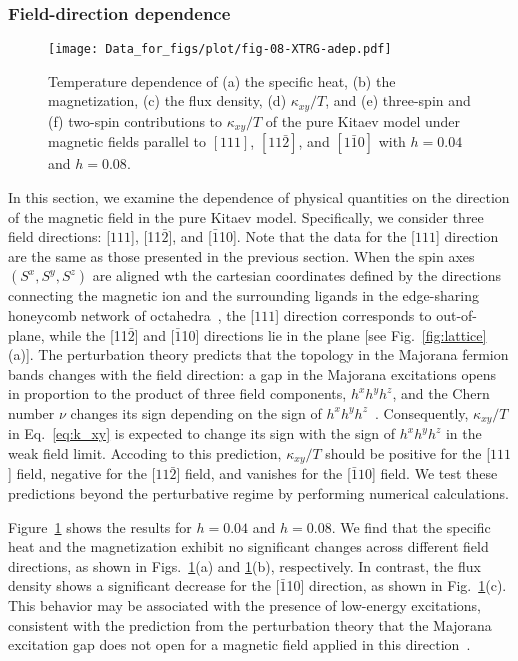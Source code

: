 \documentclass[twocolumn,superscriptaddress,showpacs, longbibliography, aps, prx]{revtex4-2}
\begin{document}
\subsubsection{Field-direction dependence}
\label{subsec:field_direction_dep}

\begin{figure}[htb]
  \begin{center}
    \texttt{[image: Data\_for\_figs/plot/fig-08-XTRG-adep.pdf]}
  \end{center}  
  \caption{Temperature dependence of (a) the specific heat, (b) the magnetization, (c) the flux density, (d) $\kappa_{xy}/T$, and (e) three-spin and (f) two-spin contributions to $\kappa_{xy}/T$ of the pure Kitaev model under magnetic fields parallel to $[111]$, $[11\bar{2}]$, and $[1\bar{1}0]$ with $h=0.04$ and $h = 0.08$.
  }
  \label{fig:CMF_ab}
\end{figure}
In this section, we examine the dependence of physical quantities on the direction of the magnetic field in the pure Kitaev model.
Specifically, we consider three field directions:
[$111$], [11$\bar{2}$], and [$\bar{1}$10]. 
Note that the data for the [$111$] direction are the same as those presented in the previous section. 
When the spin axes $(S^x, S^y, S^z)$ are aligned wth the cartesian coordinates defined by the directions connecting the magnetic ion and the surrounding ligands in the edge-sharing honeycomb network of octahedra~\cite{Jackeli_PRL2009},  the [$111$] direction corresponds to out-of-plane, while the [11$\bar{2}$] and [$\bar{1}$10] directions lie in the plane [see Fig.~\ref{fig:lattice}(a)]. 
The perturbation theory predicts that the topology in the Majorana fermion bands changes with the field direction: a gap in the Majorana excitations opens in proportion to the product of three field components, $h^x h^y h^z$, and the Chern number $\nu$ changes its sign depending on the sign of $h^x h^y h^z$~\cite{Kitaev2006}. 
Consequently, $\kappa_{xy}/T$ in Eq.~\eqref{eq:k_xy} is expected to change its sign with the sign of $h^x h^y h^z$ in the weak field limit. 
Accoding to this prediction, $\kappa_{xy}/T$ should be positive for the [$111$] field, negative for the [$11\bar{2}]$ field, and vanishes for the [$\bar{1}10$] field.
We test these predictions beyond the perturbative regime by performing numerical calculations.

Figure~\ref{fig:CMF_ab} shows the results for  $h=0.04$ and $h=0.08$. 
We find that the specific heat and the magnetization exhibit no significant changes across different field directions, as shown in Figs.~\ref{fig:CMF_ab}(a) and \ref{fig:CMF_ab}(b), respectively. 
In contrast, the flux density shows a significant decrease for the [$\bar{1}$10] direction, as shown in Fig.~\ref{fig:CMF_ab}(c). 
This behavior may be associated with the presence of low-energy excitations, consistent with the prediction from the perturbation theory that the Majorana excitation gap does not open for a magnetic field applied in this direction~\cite{Kitaev2006}.
\end{document}
